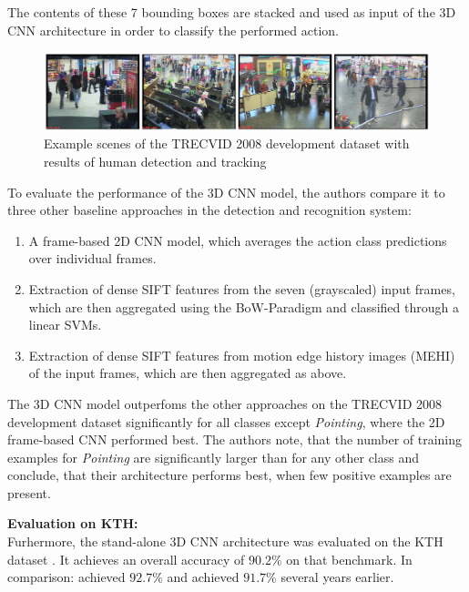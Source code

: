 The contents of these 7 bounding boxes are stacked and used as input of the 3D CNN architecture in order to classify the performed action.

\begin{figure}[H]
    \centering
    \includegraphics[width=\textwidth]{img_deep/3dconv_sampletracking}
    \caption{Example scenes of the TRECVID 2008 development dataset with results of human detection and tracking \cite{ji_3d_2013}}
    \label{fig:3dconv_sampletracking}
\end{figure}

To evaluate the performance of the 3D CNN model, the authors compare it to three other baseline approaches in the detection and recognition system:
\begin{enumerate}
    \item A frame-based 2D CNN model, which averages the action class predictions over individual frames.
    \item Extraction of dense SIFT features \cite{lowe_distinctive_2004} from the seven (grayscaled) input frames, which are then aggregated using the BoW-Paradigm and classified through a linear SVMs.
    \item Extraction of dense SIFT features \cite{lowe_distinctive_2004} from motion edge history images (MEHI)\cite{yang_human_2009} of the input frames, which are then aggregated as above.
\end{enumerate}

The 3D CNN model outperfoms the other approaches on the TRECVID 2008 development dataset significantly for all classes except \textit{Pointing}, where the 2D frame-based CNN performed best.
The authors note, that the number of training examples for \textit{Pointing} are significantly larger than for any other class and conclude, that their architecture performs best, when few positive examples are present.

\textbf{Evaluation on KTH:}\\
Furhermore, the stand-alone 3D CNN architecture was evaluated on the KTH dataset \cite{schuldt_recognizing_2004}.
It achieves an overall accuracy of $90.2\%$ on that benchmark.
In comparison: \textcite{schindler_action_2008} achieved $92.7\%$ and \textcite{jhuang_biologically_2007} achieved $91.7\%$ several years earlier.

